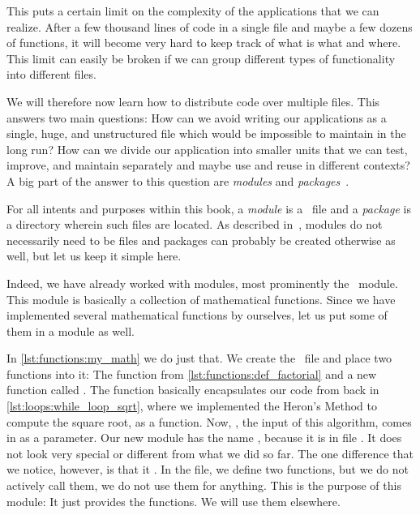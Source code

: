 This puts a certain limit on the complexity of the applications that we can realize.
After a few thousand lines of code in a single file and maybe a few dozens of functions, it will become very hard to keep track of what is what and where.
This limit can easily be broken if we can group different types of functionality into different files.

We will therefore now learn how to distribute code over multiple files.
This answers two main questions:
How can we avoid writing our applications as a single, huge, and unstructured file which would be impossible to maintain in the long run?
How can we divide our application into smaller units that we can test, improve, and maintain separately and maybe use and reuse in different contexts?
A big part of the answer to this question are \emph{modules} and \emph{packages}~\cite{PSF:P3D:TPLR:TIS}.

For all intents and purposes within this book, a \emph{module} is a \python\ file and a \emph{package} is a directory wherein such files are located.
As described in~\cite{PSF:P3D:TPLR:TIS}, modules do not necessarily need to be files and packages can probably be created otherwise as well, but let us keep it simple here.

Indeed, we have already worked with modules, most prominently the~ module.
This module is basically a collection of mathematical functions.
Since we have implemented several mathematical functions by ourselves, let us put some of them in a module as well.

In \cref{lst:functions:my_math} we do just that.
We create the \python\ file  and place two functions into it:
The function  from \cref{lst:functions:def_factorial} and a new function called .
The  function basically encapsulates our code from back in \cref{lst:loops:while_loop_sqrt}, where we implemented the Heron's Method to compute the square root, as a function.
Now, , the input of this algorithm, comes in as a parameter.%
%
%
%
Our new module has the name , because it is in file .
It does not look very special or different from what we did so far.
The one difference that we notice, however, is that it .
In the file, we define two functions, but we do not actively call them, we do not use them for anything.
This is the purpose of this module:
It just provides the functions.
We will use them elsewhere.

